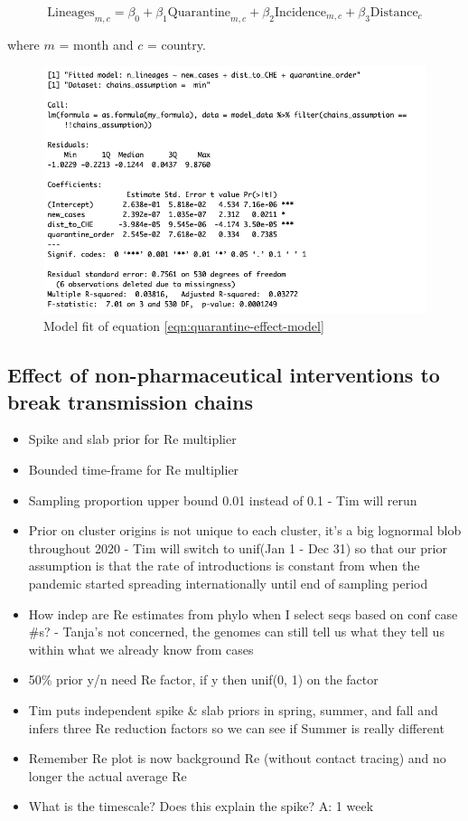 \documentclass[9pt,twocolumn,twoside,lineno]{pnas-new}
\begin{document}
\begin{equation}
    \text{Lineages}_{m,c} = \beta_0 + \beta_1 \text{Quarantine}_{m,c} + \beta_2 \text{Incidence}_{m,c} + \beta_3 \text{Distance}_{c}
    \label{eqn:quarantine-effect-model}
\end{equation}

where $m$ = month and $c$ = country.

\begin{figure}[tbhp]
\centering
\includegraphics[width = 0.8\linewidth]{figures/part_II_model_fit.png}
\caption{Model fit of equation \ref{eqn:quarantine-effect-model}}  
\label{fig:quarantine-effect-model-fit}
\end{figure}


\subsection{Effect of non-pharmaceutical interventions to break transmission chains}

\begin{itemize}
    \item Spike and slab prior for Re multiplier
    \item Bounded time-frame for Re multiplier
    \item Sampling proportion upper bound 0.01 instead of 0.1 - Tim will rerun
    \item Prior on cluster origins is not unique to each cluster, it's a big lognormal blob throughout 2020 - Tim will switch to unif(Jan 1 - Dec 31) so that our prior assumption is that the rate of introductions is constant from when the pandemic started spreading internationally until end of sampling period
    \item How indep are Re estimates from phylo when I select seqs based on conf case \#s? - Tanja's not concerned, the genomes can still tell us what they tell us within what we already know from cases
    \item 50\% prior y/n need Re factor, if y then unif(0, 1) on the factor 
    \item Tim puts independent spike & slab priors in spring, summer, and fall and infers three Re reduction factors so we can see if Summer is really different
    \item Remember Re plot is now background Re (without contact tracing) and no longer the actual average Re
    \item What is the timescale? Does this explain the spike? A: 1 week
\end{itemize}
\end{document}
